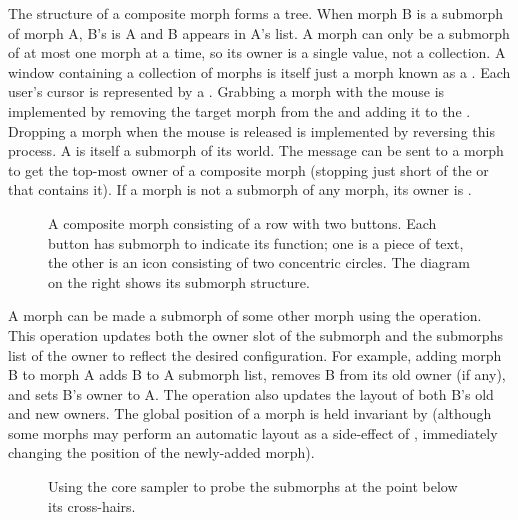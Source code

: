 \documentclass[letterpaper,10pt,english]{sphinxmanual}
\begin{document}
The structure of a composite morph forms a tree. When morph B is a submorph of morph A, B's  is A and B appears in A's  list. A morph can only be a submorph of at most one morph at a time, so its owner is a single value, not a collection. A window containing a collection of morphs is itself just a morph known as a . Each user's cursor is represented by a . Grabbing a morph with the mouse is implemented by removing the target morph from the  and adding it to the . Dropping a morph when the mouse is released is implemented by reversing this process. A  is itself a submorph of its world. The message  can be sent to a morph to get the top-most owner of a composite morph (stopping just short of the  or  that contains it). If a morph is not a submorph of any morph, its owner is .
\begin{figure}[htbp]
\centering
\capstart

\noindent{}
\caption{A composite morph consisting of a row with two buttons. Each button has submorph to indicate its function; one is a piece of text, the other is an icon consisting of two concentric circles. The diagram on the right shows its submorph structure.}\label{\detokenize{morphic:id4}}\end{figure}

A morph can be made a submorph of some other morph using the  operation. This operation updates both the owner slot of the submorph and the submorphs list of the owner to reflect the desired configuration. For example, adding morph B to morph A adds B to A submorph list, removes B from its old owner (if any), and sets B's owner to A. The  operation also updates the layout of both B's old and new owners. The global position of a morph is held invariant by  (although some morphs may perform an automatic layout as a side-effect of , immediately changing the position of the newly-added morph).
\begin{figure}[htbp]
\centering
\capstart

\noindent{}
\caption{Using the core sampler to probe the submorphs at the point below its cross-hairs.}\label{\detokenize{morphic:id5}}\end{figure}
\end{document}
